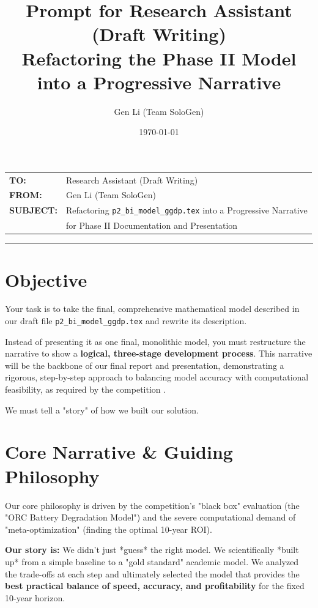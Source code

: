 \documentclass[11pt, a4paper]{article}
\title{Prompt for Research Assistant (Draft Writing) \\ \large Refactoring the Phase II Model into a Progressive Narrative}
\author{Gen Li (Team SoloGen)}
\date{\today}
\begin{document}
\maketitle
\thispagestyle{fancy}

\begin{center}
\begin{tabular}{@{}ll}
    \textbf{TO:} & Research Assistant (Draft Writing) \\
    \textbf{FROM:} & Gen Li (Team SoloGen) \\
    \textbf{SUBJECT:} & Refactoring \texttt{p2\_bi\_model\_ggdp.tex} into a Progressive Narrative \\
    & for Phase II Documentation and Presentation \\
\end{tabular}
\end{center}
\vspace{1em}
\hrule
\vspace{1em}

\section{Objective}
Your task is to take the final, comprehensive mathematical model described in our draft file \texttt{p2\_bi\_model\_ggdp.tex} and rewrite its description.

Instead of presenting it as one final, monolithic model, you must restructure the narrative to show a \textbf{logical, three-stage development process}. This narrative will be the backbone of our final report and presentation, demonstrating a rigorous, step-by-step approach to balancing model accuracy with computational feasibility, as required by the competition \cite{huawei2025}.

We must tell a "story" of how we built our solution.

\section{Core Narrative \& Guiding Philosophy}
Our core philosophy is driven by the competition's "black box" evaluation (the "ORC Battery Degradation Model") and the severe computational demand of "meta-optimization" (finding the optimal 10-year ROI).

\textbf{Our story is:} We didn't just *guess* the right model. We scientifically *built up* from a simple baseline to a "gold standard" academic model. We analyzed the trade-offs at each step and ultimately selected the model that provides the \textbf{best practical balance of speed, accuracy, and profitability} for the fixed 10-year horizon.
\end{document}
